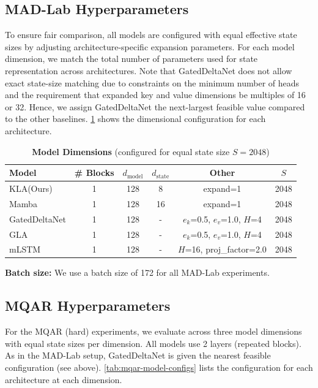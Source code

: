 \documentclass{article}
\newcommand{\our}{\textsc{KLA}\xspace}
\begin{document}
\subsection{MAD-Lab Hyperparameters}
\label{sec:madlab-hyperparams}

To ensure fair comparison, all models are configured with equal effective state sizes by adjusting architecture-specific expansion parameters. For each model dimension, we match the total number of parameters used for state representation across architectures. Note that GatedDeltaNet does not allow exact state-size matching due to constraints on the minimum number of heads and the requirement that expanded key and value dimensions be multiples of 16 or 32. Hence, we assign GatedDeltaNet the next-largest feasible value compared to the other baselines. \cref{tab:model-dims} shows the dimensional configuration for each architecture.

\begin{table}[h]
\caption{\textbf{Model Dimensions} (configured for equal state size $S = 2048$)}
\label{tab:model-dims}
\begin{center}
\begin{small}
\begin{tabular}{lccccc}
\toprule
\textbf{Model} & \textbf{\# Blocks} & $d_{\text{model}}$ & $d_{\text{state}}$ & \textbf{Other} & $S$ \\
\midrule
\our (Ours) & 1 & 128 & 8 & expand=1 & 2048 \\
Mamba & 1 & 128 & 16 & expand=1 & 2048 \\
GatedDeltaNet & 1 & 128 & - & $e_k$=0.5, $e_v$=1.0, $H$=4 & 2048 \\
GLA & 1 & 128 & - & $e_k$=0.5, $e_v$=1.0, $H$=4 & 2048 \\
mLSTM & 1 & 128 & - & $H$=16, proj\_factor=2.0 & 2048 \\
\bottomrule
\end{tabular}
\end{small}
\end{center}
\vskip -0.1in
\end{table}

\noindent\textbf{Batch size:} We use a batch size of 172 for all MAD-Lab experiments.


\subsection{MQAR Hyperparameters}
\label{sec:mqar-hyperparams}

For the MQAR (hard) experiments, we evaluate across three model dimensions with equal state sizes per dimension. All models use 2 layers (repeated blocks). As in the MAD-Lab setup, GatedDeltaNet is given the nearest feasible configuration (see above). \cref{tab:mqar-model-configs} lists the configuration for each architecture at each dimension.
\end{document}
